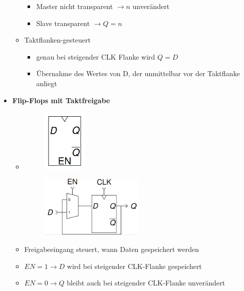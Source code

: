 \documentclass[11pt,a4paper]{article}
\begin{document}
\begin{itemize}
\begin{itemize}
\begin{itemize}
 		\item Master nicht transparent $\rightarrow n$ unverändert
 		\item Slave transparent $\rightarrow Q = n$
 		\end{itemize}
 	\item Taktflanken-gesteuert
 		\vspace{-0.3cm}
 		\begin{itemize}
 		\item genau bei steigender CLK Flanke wird $Q=D$
 		\item Übernahme des Wertes von D, der unmittelbar vor der Taktflanke anliegt
 		\end{itemize}
 	\end{itemize}
 	
\item \textbf{Flip-Flops mit Taktfreigabe}
	\begin{itemize}
	\item[]		
				\begin{minipage}{0.25\textwidth}
					\begin{figure}[H]
					\includegraphics[height=3cm]{takt1}
					\end{figure}
				\end{minipage}
				\begin{minipage}[t]{0.6\textwidth}
					\vspace{-2.25cm}
					\begin{figure}[H]
					\includegraphics[height=3cm]{takt2}
					\end{figure}
				\end{minipage}
	\end{itemize}
	\begin{itemize}
		\item Freigabeeingang steuert, wann Daten gespeichert werden
		\item $EN = 1 \rightarrow D$ wird bei steigender CLK-Flanke gespeichert
		\item $EN = 0 \rightarrow Q$ bleibt auch bei steigender CLK-Flanke unverändert
 	\end{itemize}
 	

\end{itemize}
\end{document}
